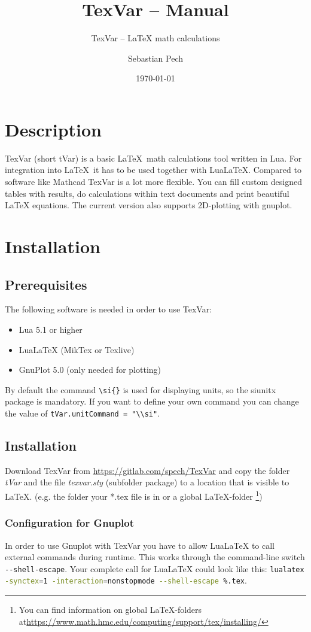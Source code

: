 \documentclass[fleqn]{mybase}
\title{TexVar -- Manual}
\subtitle{TexVar -- LaTeX math calculations\\[0.5 cm]\normalsize\directlua{tVar.getVersion()}}
\date{\today}
\author{Sebastian Pech}
\begin{document}
\maketitle
\tableofcontents
\section{Description}
TexVar (short tVar) is a basic \LaTeX~math calculations tool written in Lua.
For integration into \LaTeX~it has to be used together with LuaLaTeX. Compared
to software like Mathcad TexVar is a lot more flexible. You can fill custom
designed tables with results, do calculations within text documents and print
beautiful LaTeX equations. The current version also supports 2D-plotting with
gnuplot.
\section{Installation}
\subsection{Prerequisites}
The following software is needed in order to use TexVar:
\begin{itemize}
	\item Lua 5.1 or higher
	\item LuaLaTeX (MikTex or Texlive)
	\item GnuPlot 5.0 (only needed for plotting)
\end{itemize}
By default the command \verb|\si{}| is used for displaying units, so the
siunitx package is mandatory. If you want to define your own command you can
change the value of \verb|tVar.unitCommand = "\\si"|. 
\subsection{Installation}
Download TexVar from \url{https://gitlab.com/spech/TexVar} and copy the folder
\emph{tVar} and the file \emph{texvar.sty} (subfolder package) to a location
that is visible to \LaTeX. (e.g. the folder your *.tex file is in or a global
\LaTeX-folder \footnote{You can find information on global \LaTeX-folders
at\url{https://www.math.hmc.edu/computing/support/tex/installing/}})
\subsubsection{Configuration for Gnuplot}
In order to use Gnuplot with TexVar you have to allow LuaLaTeX to call external
commands during runtime. This works through the command-line switch
\lstinline[language=Bash]|--shell-escape|. Your complete call for LuaLaTeX
could look like this: \lstinline[language=Bash]|lualatex -synctex=1 -interaction=nonstopmode --shell-escape %.tex|. 
\end{document}
